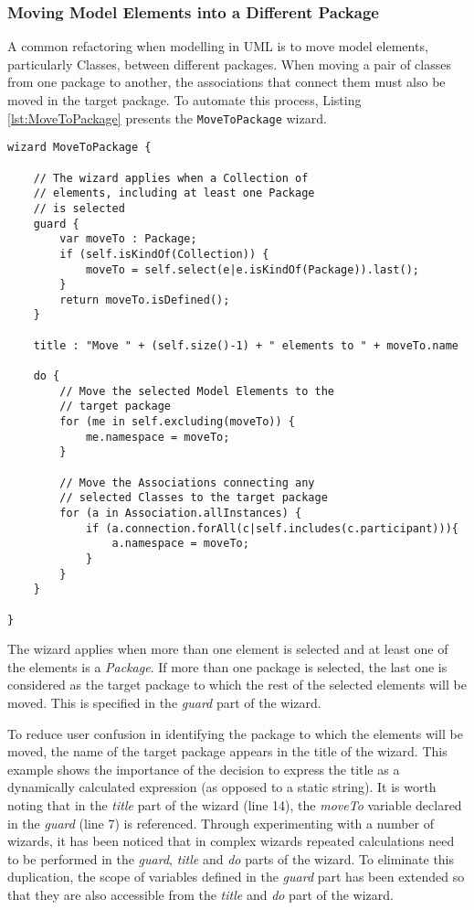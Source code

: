 \subsubsection{Moving Model Elements into a Different Package}
\label{sec:MoveToPackage}

A common refactoring when modelling in UML is to move model elements, particularly Classes, between different packages. When moving a pair of classes from one package to another, the associations that connect them must also be moved in the target package. To automate this process, Listing \ref{lst:MoveToPackage} presents the \texttt{MoveToPackage} wizard.

\begin{lstlisting}[float=tbp, 
	basicstyle=\ttfamily\footnotesize, 
	flexiblecolumns=true, 
	numbers=none, 
	nolol=true, 
	caption=Implementation of the MoveToPackage Wizard, 
	label=lst:MoveToPackage, 
	numbers=left, 
	language=EWL, 
	tabsize=2
]
wizard MoveToPackage {
	
	// The wizard applies when a Collection of
	// elements, including at least one Package
	// is selected
	guard { 
		var moveTo : Package;
		if (self.isKindOf(Collection)) {
			moveTo = self.select(e|e.isKindOf(Package)).last();
		}
		return moveTo.isDefined();
	}
	
	title : "Move " + (self.size()-1) + " elements to " + moveTo.name
	
	do {
		// Move the selected Model Elements to the
		// target package
		for (me in self.excluding(moveTo)) {
			me.namespace = moveTo;
		}
		
		// Move the Associations connecting any
		// selected Classes to the target package
		for (a in Association.allInstances) {
			if (a.connection.forAll(c|self.includes(c.participant))){
				a.namespace = moveTo;
			}
		}
	}
	
}
\end{lstlisting}

The wizard applies when more than one element is selected and at least one of the elements is a \emph{Package}. If more than one package is selected, the last one is considered as the target package to which the rest of the selected elements will be moved. This is specified in the \emph{guard} part of the wizard.

To reduce user confusion in identifying the package to which the elements will be moved, the name of the target package appears in the title of the wizard. This example shows the importance of the decision to express the title as a dynamically calculated expression (as opposed to a static string). It is worth noting that in the \emph{title} part of the wizard (line 14), the \emph{moveTo} variable declared in the \emph{guard} (line 7) is referenced. Through experimenting with a number of wizards, it has been noticed that in complex wizards repeated calculations need to be performed in the \emph{guard}, \emph{title} and \emph{do} parts of the wizard. To eliminate this duplication, the scope of variables defined in the \emph{guard} part has been extended so that they are also accessible from the \emph{title} and \emph{do} part of the wizard.
